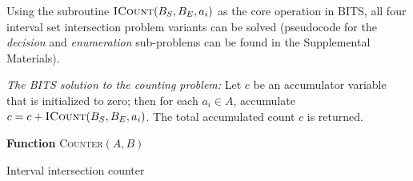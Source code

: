 \documentclass{bioinfo}
\begin{document}

Using the subroutine $\textsc{ICount}(B_S,B_E,a_i)$ as the core operation in
BITS, all four interval set intersection problem variants can be solved
(pseudocode for the \emph{decision} and \emph{enumeration} sub-problems can be
found in the Supplemental Materials).


	{\em The BITS solution to the counting problem:}
	Let $c$ be an accumulator variable that is initialized to zero; then for
	each $a_i \in A$, accumulate $c = c + \textsc{ICount}(B_S,B_E,a_i)$.  The
	total accumulated count $c$ is returned.
	\begin{algorithm}[h]
		\DontPrintSemicolon
		\footnotesize
		\BlankLine
		\textbf{Function} \textsc{Counter}$(A,B)$
		\caption{Interval intersection counter}
	\end{algorithm}
	
\end{document}
